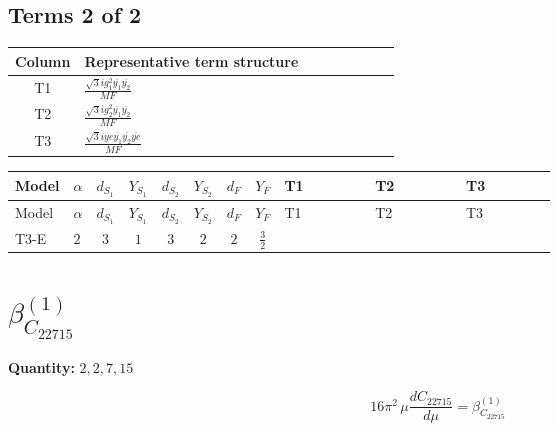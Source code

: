 \documentclass[8pt]{article}
\begin{document}
\begin{landscape}
\subsection*{Terms 2 of 2}
\begin{center}
\begin{tabular}{@{}c >{\raggedright\arraybackslash}p{0.82\linewidth}@{}}
\toprule
Column & Representative term structure \\
\midrule
T1 & \(\displaystyle \frac{\sqrt{3} i g_{1}^{2} \overline{y_{1}} \overline{y_{2}}}{MF}\) \\
\midrule
T2 & \(\displaystyle \frac{\sqrt{3} i g_{2}^{2} \overline{y_{1}} \overline{y_{2}}}{MF}\) \\
\midrule
T3 & \(\displaystyle \frac{\sqrt{3} i ye \overline{y_{1}} \overline{y_{2}} \overline{ye}}{MF}\) \\
\midrule
\bottomrule
\end{tabular}
\end{center}
\smallskip
\tiny
\begin{longtable}{@{}llcccccc >{\raggedright\arraybackslash}p{0.21\linewidth} >{\raggedright\arraybackslash}p{0.21\linewidth} >{\raggedright\arraybackslash}p{0.21\linewidth}@{}}
\toprule
Model & $\alpha$ & $d_{S_1}$ & $Y_{S_1}$ & $d_{S_2}$ & $Y_{S_2}$ & $d_F$ & $Y_F$ & T1 & T2 & T3 \\
\midrule
\endfirsthead
\toprule
Model & $\alpha$ & $d_{S_1}$ & $Y_{S_1}$ & $d_{S_2}$ & $Y_{S_2}$ & $d_F$ & $Y_F$ & T1 & T2 & T3 \\
\midrule
\endhead
T3-E & $2$ & $3$ & $1$ & $3$ & $2$ & $2$ & $\frac{3}{2}$ & \scriptsize\adjustbox{max width=\linewidth}{$\begin{gathered} \frac{9 \sqrt{3} i g_{1}^{2} \overline{y_{1}} \overline{y_{2}}}{8 MF}\end{gathered}$} & \scriptsize\adjustbox{max width=\linewidth}{$\begin{gathered} \frac{11 \sqrt{3} i g_{2}^{2} \overline{y_{1}} \overline{y_{2}}}{8 MF}\end{gathered}$} & \scriptsize\adjustbox{max width=\linewidth}{$\begin{gathered} - \frac{\sqrt{3} i ye \overline{y_{1}} \overline{y_{2}} \overline{ye}}{12 MF}\end{gathered}$} \\
\midrule
\bottomrule
\end{longtable}
\clearpage
\section*{$\beta_{C_{22715}}^{(1)}$}
\noindent\textbf{Quantity: }$\mathrm{2,2,7,15}$\par\smallskip
\[16\pi^2\,\mu\frac{d C_{22715}}{d\mu}=\beta_{C_{22715}}^{(1)}\]

\end{landscape}
\end{document}
